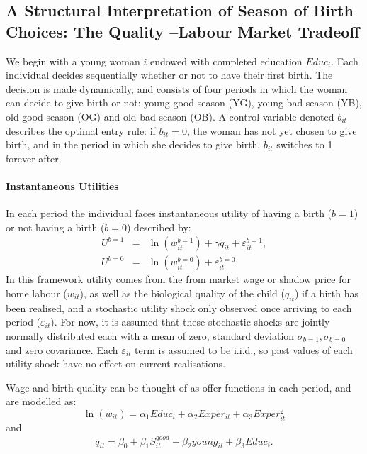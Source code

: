 \documentclass[a4paper, 11 pt]{article}
\theoremstyle{plain}
\begin{document}
\begin{spacing}{1.4}
\subsection{A Structural Interpretation of Season of Birth Choices: The Quality%
--Labour Market Tradeoff}
We begin with a young woman $i$ endowed with completed education $Educ_i$.  Each
individual decides sequentially whether or not to have their first birth.  The 
decision is made dynamically, and consists of four periods in which the woman 
can decide to give birth or not: young good season (YG), young bad season (YB), 
old good season (OG) and old bad season (OB). A control variable denoted $b_{it}$ 
describes the optimal entry rule: if $b_{it}=0$, the woman has not yet chosen to 
give birth, and in the period in which she decides to give birth, $b_{it}$ 
switches to 1 forever after. 

\paragraph{Instantaneous Utilities}
In each period the individual faces instantaneous utility of having a birth
($b=1$) or not having a birth ($b=0$) described by:
\begin{eqnarray}
U^{b=1}&=&\ln(w_{it}^{b=1}) + \gamma q_{it} + \varepsilon^{b=1}_{it}, \nonumber \\
U^{b=0}&=&\ln(w_{it}^{b=0}) + \varepsilon^{b=0}_{it}. \nonumber 
\end{eqnarray}
In this framework utility comes from the from market wage or shadow price for 
home labour ($w_{it}$), as well as the biological quality of the child ($q_{it}$)
if a birth has been realised, and a stochastic utility shock only observed once 
arriving to each period ($\varepsilon_{it}$).  For now, it is assumed that these
stochastic shocks are jointly normally distributed each with a mean of zero, 
standard deviation $\sigma_{b=1},\sigma_{b=0}$ and zero covariance.  Each 
$\varepsilon_{it}$ term is assumed to be i.i.d., so past values of each utility
shock have no effect on current realisations.

Wage and birth quality can be thought of as offer functions in each period, and 
are modelled as:
\[
\ln(w_{it})=\alpha_1 Educ_{i} + \alpha_2 Exper_{it} + \alpha_3 Exper_{it}^2
\]
and
\[
q_{it} = \beta_0 + \beta_1 S^{good}_{it} + \beta_2 young_{it} + \beta_3 Educ_{i}.
\]


\end{spacing}
\end{document}
